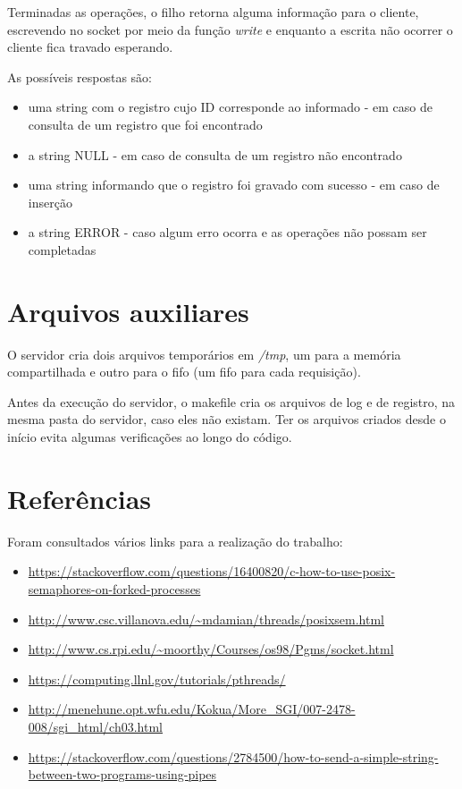 \documentclass[12pt]{article}
\begin{document}
Terminadas as operações, o filho retorna alguma informação para o cliente, escrevendo no socket por meio da função \emph{write} e enquanto a escrita não ocorrer o cliente fica travado esperando.

As possíveis respostas são:

\begin{itemize}
\item uma string com o registro cujo ID corresponde ao informado - em caso de consulta de um registro que foi encontrado
\item a string NULL - em caso de consulta de um registro não encontrado
\item uma string informando que o registro foi gravado com sucesso - em caso de inserção
\item a string ERROR - caso algum erro ocorra e as operações não possam ser completadas
\end{itemize}

\section{Arquivos auxiliares}

O servidor cria dois arquivos temporários em \emph{/tmp}, um para a memória compartilhada e outro para o fifo (um fifo para cada requisição).

Antes da execução do servidor, o makefile cria os arquivos de log e de registro, na mesma pasta do servidor, caso eles não existam. Ter os arquivos criados desde o início evita algumas verificações ao longo do código.

\section*{Referências}

Foram consultados vários links para a realização do trabalho:

\begin{itemize}
\item \url{https://stackoverflow.com/questions/16400820/c-how-to-use-posix-semaphores-on-forked-processes}
\item \url{http://www.csc.villanova.edu/~mdamian/threads/posixsem.html}
\item \url{http://www.cs.rpi.edu/~moorthy/Courses/os98/Pgms/socket.html}
\item \url{https://computing.llnl.gov/tutorials/pthreads/}
\item \url{http://menehune.opt.wfu.edu/Kokua/More_SGI/007-2478-008/sgi_html/ch03.html}
\item \url{https://stackoverflow.com/questions/2784500/how-to-send-a-simple-string-between-two-programs-using-pipes}
\end{itemize}
\end{document}
